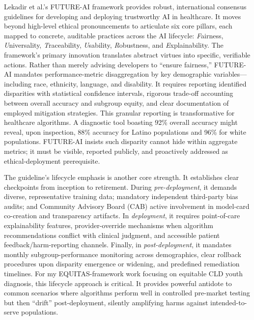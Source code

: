 \documentclass[11pt,twoside]{article}
\begin{document}
Lekadir et al.'s FUTURE-AI framework provides robust, international consensus guidelines for developing and deploying trustworthy AI in healthcare. It moves beyond high-level ethical pronouncements to articulate six core pillars, each mapped to concrete, auditable practices across the AI lifecycle: \textit{F}airness, \textit{U}niversality, \textit{T}raceability, \textit{U}sability, \textit{R}obustness, and \textit{E}xplainability. The framework's primary innovation translates abstract virtues into specific, verifiable actions. Rather than merely advising developers to ``ensure fairness,'' FUTURE-AI mandates performance-metric disaggregation by key demographic variables---including race, ethnicity, language, and disability. It requires reporting identified disparities with statistical confidence intervals, rigorous trade-off accounting between overall accuracy and subgroup equity, and clear documentation of employed mitigation strategies. This granular reporting is transformative for healthcare algorithms. A diagnostic tool boasting 92\% overall accuracy might reveal, upon inspection, 88\% accuracy for Latino populations and 96\% for white populations. FUTURE-AI insists such disparity cannot hide within aggregate metrics; it must be visible, reported publicly, and proactively addressed as ethical-deployment prerequisite.

The guideline's lifecycle emphasis is another core strength. It establishes clear checkpoints from inception to retirement. During \textit{pre-deployment}, it demands diverse, representative training data; mandatory independent third-party bias audits; and Community Advisory Board (CAB) active involvement in model-card co-creation and transparency artifacts. In \textit{deployment}, it requires point-of-care explainability features, provider-override mechanisms when algorithm recommendations conflict with clinical judgment, and accessible patient feedback/harm-reporting channels. Finally, in \textit{post-deployment}, it mandates monthly subgroup-performance monitoring across demographics, clear rollback procedures upon disparity emergence or widening, and predefined remediation timelines. For my EQUITAS-framework work focusing on equitable CLD youth diagnosis, this lifecycle approach is critical. It provides powerful antidote to common scenarios where algorithms perform well in controlled pre-market testing but then ``drift'' post-deployment, silently amplifying harms against intended-to-serve populations.
\end{document}
